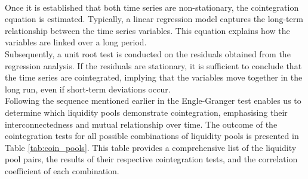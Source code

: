 \\[3mm]
Once it is established that both time series are non-stationary, the cointegration equation is estimated. Typically, a linear regression model captures the long-term relationship between the time series variables. This equation explains how the variables are linked over a long period.
\\[3mm]
Subsequently, a unit root test is conducted on the residuals obtained from the regression analysis. If the residuals are stationary, it is sufficient to conclude that the time series are cointegrated, implying that the variables move together in the long run, even if short-term deviations occur.
\\[3mm]
Following the sequence mentioned earlier in the Engle-Granger test enables us to determine which liquidity pools demonstrate cointegration, emphasising their interconnectedness and mutual relationship over time. The outcome of the cointegration tests for all possible combinations of liquidity pools is presented in Table \ref{tab:coin_pools}. This table provides a comprehensive list of the liquidity pool pairs, the results of their respective cointegration tests, and the correlation coefficient of each combination.
